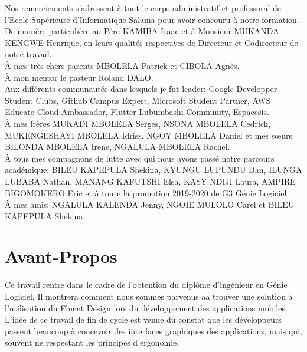 \documentclass[a4paper,12pt]{report}
\begin{document}
    Nos remerciements s’adressent à tout le corps administratif et professoral de l’Ecole
    Supérieure d’Informatique Salama pour avoir concouru à notre formation.
    \\
    De manière particulière au Père KAMIBA Isaac et à Monsieur MUKANDA KENGWE Henrique,
    en leurs qualités respectives de Directeur et Co\-directeur de notre travail.
    \\
    À mes très chers parents MBOLELA Patrick et CIBOLA Agnès.
    \\
    À mon mentor le pasteur Roland DALO.
    \\
    Aux différents communautés dans lesquels je fut leader: Google Developper Student Clubs, Github Campus Expert,
    Microsoft Student Partner, AWS Educate Cloud Ambassador, Flutter Lubumbashi Community, Espacesis.
    \\
    À mes frères MUKADI MBOLELA Serges, NSONA MBOLELA Cedrick, MUKENGESHAYI MBOLELA Idriss,
    NGOY MBOLELA Daniel et mes sœurs BILONDA MBOLELA Irene, NGALULA MBOLELA Rachel.
    \\

    À tous mes compagnons de lutte avec qui nous avons passé notre parcours
    académique: BILEU KAPEPULA Shekina, KYUNGU LUPUNDU Dan, ILUNGA LUBABA Nathan, MANANG KAFUTSHI Elsa, 
    KASY NDIJI Laura, 
    AMPIRE BIGOMOKERO Eric et à toute la promotion 2019-2020 de G3 Génie Logiciel.
    \\
    À mes amis: NGALULA KALENDA Jenny, NGOIE MULOLO Carel et BILEU KAPEPULA Shekina.
    \\

    \newpage

    \listoffigures
    \newpage

    \listoftables
    \newpage

    \tableofcontents
    \newpage

    \chapter*{Avant-Propos}
    Ce travail rentre dans le cadre de l’obtention du diplôme d'ingénieur en Génie Logiciel. 
    Il montrera comment nous sommes parvenus aa trouver une solution à l'utilisation du Fluent Design lors du développement des applications mobiles. L’idée de ce travail de fin de cycle est venue du constat que les développeurs passent beaucoup à concevoir des interfaces graphiques des applications, mais qui, souvent ne respectant les principes d'ergonomie.
    
\end{document}

